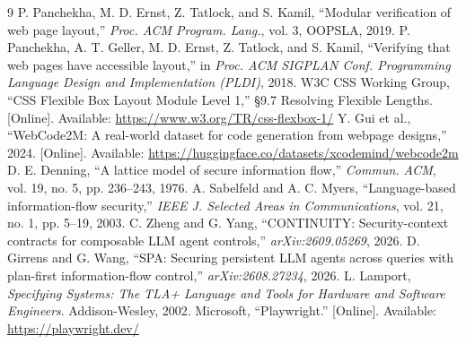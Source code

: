 \documentclass[acmsmall,screen,review,anonymous,nonacm]{acmart}
\begin{document}
\begin{thebibliography}{9}
 P. Panchekha, M. D. Ernst, Z. Tatlock, and S. Kamil, ``Modular verification of web page layout,'' \emph{Proc. ACM Program. Lang.}, vol. 3, OOPSLA, 2019.
 P. Panchekha, A. T. Geller, M. D. Ernst, Z. Tatlock, and S. Kamil, ``Verifying that web pages have accessible layout,'' in \emph{Proc. ACM SIGPLAN Conf. Programming Language Design and Implementation (PLDI)}, 2018.
 W3C CSS Working Group, ``CSS Flexible Box Layout Module Level 1,'' \S9.7 Resolving Flexible Lengths. [Online]. Available: \url{https://www.w3.org/TR/css-flexbox-1/}
 Y. Gui et al., ``WebCode2M: A real-world dataset for code generation from webpage designs,'' 2024. [Online]. Available: \url{https://huggingface.co/datasets/xcodemind/webcode2m}
 D. E. Denning, ``A lattice model of secure information flow,'' \emph{Commun. ACM}, vol. 19, no. 5, pp. 236--243, 1976.
 A. Sabelfeld and A. C. Myers, ``Language-based information-flow security,'' \emph{IEEE J. Selected Areas in Communications}, vol. 21, no. 1, pp. 5--19, 2003.
 C. Zheng and G. Yang, ``CONTINUITY: Security-context contracts for composable LLM agent controls,'' \emph{arXiv:2609.05269}, 2026.
 D. Girrens and G. Wang, ``SPA: Securing persistent LLM agents across queries with plan-first information-flow control,'' \emph{arXiv:2608.27234}, 2026.
 L. Lamport, \emph{Specifying Systems: The TLA+ Language and Tools for Hardware and Software Engineers}. Addison-Wesley, 2002.
 Microsoft, ``Playwright.'' [Online]. Available: \url{https://playwright.dev/}
\end{thebibliography}
\end{document}
